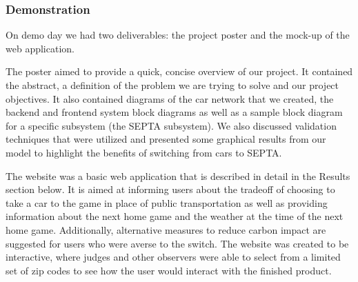 \subsubsection{Demonstration}

On demo day we had two deliverables: the project poster and the
mock-up of the web application.

The poster aimed to provide a quick, concise overview of our
project. It contained the abstract, a definition of the problem we are
trying to solve and our project objectives. It also contained diagrams
of the car network that we created, the backend and frontend system
block diagrams as well as a sample block diagram for a specific
subsystem (the SEPTA subsystem). We also discussed validation
techniques that were utilized and presented some graphical results
from our model to highlight the benefits of switching from cars to
SEPTA.

The website was a basic web application that is described in detail in
the Results section below. It is aimed at informing users about the
tradeoff of choosing to take a car to the game in place of public
transportation as well as providing information about the next home
game and the weather at the time of the next home game. Additionally,
alternative measures to reduce carbon impact are suggested for users
who were averse to the switch. The website was created to be
interactive, where judges and other observers were able to select from
a limited set of zip codes to see how the user would interact with the
finished product.
